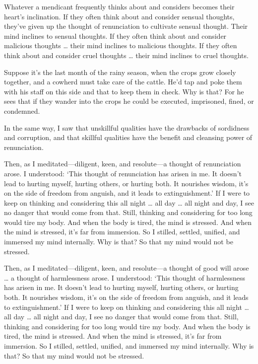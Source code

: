 \documentclass[12pt,openany]{book}%
\begin{document}
Whatever a mendicant frequently thinks about and considers becomes their heart’s inclination. If they often think about and consider sensual thoughts, they’ve given up the thought of renunciation to cultivate sensual thought. Their mind inclines to sensual thoughts. If they often think about and consider malicious thoughts … their mind inclines to malicious thoughts. If they often think about and consider cruel thoughts … their mind inclines to cruel thoughts. 

Suppose it’s the last month of the rainy season, when the crops grow closely together, and a cowherd must take care of the cattle. He’d tap and poke them with his staff on this side and that to keep them in check. Why is that? For he sees that if they wander into the crops he could be executed, imprisoned, fined, or condemned. 

In the same way, I saw that unskillful qualities have the drawbacks of sordidness and corruption, and that skillful qualities have the benefit and cleansing power of renunciation. 

Then, as I meditated—diligent, keen, and resolute—a thought of renunciation arose. I understood: ‘This thought of renunciation has arisen in me. It doesn’t lead to hurting myself, hurting others, or hurting both. It nourishes wisdom, it’s on the side of freedom from anguish, and it leads to extinguishment.’ If I were to keep on thinking and considering this all night … all day … all night and day, I see no danger that would come from that. Still, thinking and considering for too long would tire my body. And when the body is tired, the mind is stressed. And when the mind is stressed, it’s far from immersion. So I stilled, settled, unified, and immersed my mind internally. Why is that? So that my mind would not be stressed. 

Then, as I meditated—diligent, keen, and resolute—a thought of good will arose … a thought of harmlessness arose. I understood: ‘This thought of harmlessness has arisen in me. It doesn’t lead to hurting myself, hurting others, or hurting both. It nourishes wisdom, it’s on the side of freedom from anguish, and it leads to extinguishment.’ If I were to keep on thinking and considering this all night … all day … all night and day, I see no danger that would come from that. Still, thinking and considering for too long would tire my body. And when the body is tired, the mind is stressed. And when the mind is stressed, it’s far from immersion. So I stilled, settled, unified, and immersed my mind internally. Why is that? So that my mind would not be stressed. 
\end{document}
